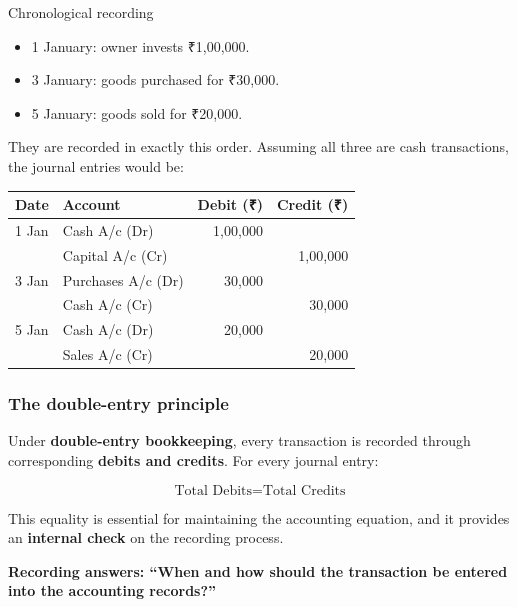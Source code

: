 \documentclass[11pt,a4paper]{article}
\newcommand{\Rs}{{\rsfont ₹}}
\begin{document}
\begin{exbox}{Chronological recording}
\begin{itemize}
  \item 1 January: owner invests \Rs 1,00,000.
  \item 3 January: goods purchased for \Rs 30,000.
  \item 5 January: goods sold for \Rs 20,000.
\end{itemize}
They are recorded in exactly this order. Assuming all three are cash transactions, the journal
entries would be:
\begin{center}
\small
\begin{tabular}{@{}l l r r@{}}
\toprule
\rowcolor{acplum!12}\textbf{Date} & \textbf{Account} & \textbf{Debit (\Rs)} & \textbf{Credit (\Rs)}\\
\midrule
1 Jan & Cash A/c \hfill (Dr) & 1,00,000 & \\
      & \quad Capital A/c \hfill (Cr) & & 1,00,000\\
\midrule
3 Jan & Purchases A/c \hfill (Dr) & 30,000 & \\
      & \quad Cash A/c \hfill (Cr) & & 30,000\\
\midrule
5 Jan & Cash A/c \hfill (Dr) & 20,000 & \\
      & \quad Sales A/c \hfill (Cr) & & 20,000\\
\bottomrule
\end{tabular}
\end{center}
\end{exbox}

\subsubsection{The double-entry principle}

Under \textbf{double-entry bookkeeping}, every transaction is recorded through corresponding
\textbf{debits and credits}. For every journal entry:

\[
\boxed{\text{Total Debits}=\text{Total Credits}}
\]

This equality is essential for maintaining the accounting equation, and it provides an
\textbf{internal check} on the recording process.

\begin{keybox}
\textbf{Recording answers: ``When and how should the transaction be entered into the accounting
records?''}
\end{keybox}

\end{document}
